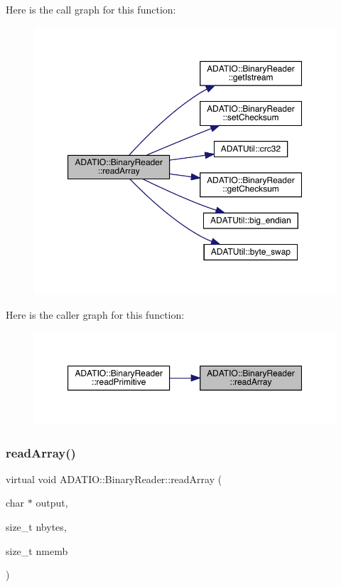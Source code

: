 Here is the call graph for this function\+:\nopagebreak
\begin{figure}[H]
\begin{center}
\leavevmode
\includegraphics[width=350pt]{da/dd9/classADATIO_1_1BinaryReader_a9c68e2d4ecd86773a48a3a38f0c90677_cgraph}
\end{center}
\end{figure}
Here is the caller graph for this function\+:\nopagebreak
\begin{figure}[H]
\begin{center}
\leavevmode
\includegraphics[width=350pt]{da/dd9/classADATIO_1_1BinaryReader_a9c68e2d4ecd86773a48a3a38f0c90677_icgraph}
\end{center}
\end{figure}
\mbox{\label{classADATIO_1_1BinaryReader_aba9bb1d3a6af4b6ab28388f6bd003d91}} 
\subsubsection{\texorpdfstring{readArray()}{readArray()}\hspace{0.1cm}{\footnotesize\ttfamily [2/2]}}
{\footnotesize\ttfamily virtual void A\+D\+A\+T\+I\+O\+::\+Binary\+Reader\+::read\+Array (\begin{DoxyParamCaption}\item[{char $\ast$}]{output,  }\item[{size\+\_\+t}]{nbytes,  }\item[{size\+\_\+t}]{nmemb }\end{DoxyParamCaption})\hspace{0.3cm}{\ttfamily [virtual]}}



